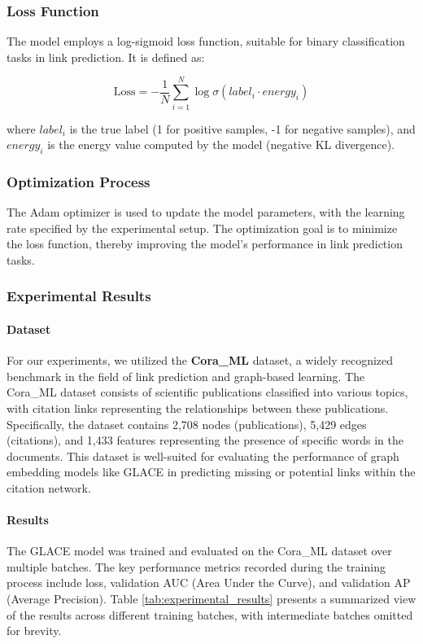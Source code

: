 \documentclass[11pt]{article}
\begin{document}
\subsubsection{Loss Function}

The model employs a log-sigmoid loss function, suitable for binary classification tasks in link prediction. It is defined as:

\[
\text{Loss} = -\frac{1}{N} \sum_{i=1}^{N} \log \sigma(label_i \cdot energy_i)
\]

where $label_i$ is the true label (1 for positive samples, -1 for negative samples), and $energy_i$ is the energy value computed by the model (negative KL divergence).

\subsubsection{Optimization Process}

The Adam optimizer is used to update the model parameters, with the learning rate specified by the experimental setup. The optimization goal is to minimize the loss function, thereby improving the model's performance in link prediction tasks.

\subsubsection{Experimental Results}

\paragraph{Dataset}
For our experiments, we utilized the \textbf{Cora\_ML} dataset, a widely recognized benchmark in the field of link prediction and graph-based learning. The Cora\_ML dataset consists of scientific publications classified into various topics, with citation links representing the relationships between these publications. Specifically, the dataset contains 2,708 nodes (publications), 5,429 edges (citations), and 1,433 features representing the presence of specific words in the documents. This dataset is well-suited for evaluating the performance of graph embedding models like GLACE in predicting missing or potential links within the citation network.

\paragraph{Results}
The GLACE model was trained and evaluated on the Cora\_ML dataset over multiple batches. The key performance metrics recorded during the training process include loss, validation AUC (Area Under the Curve), and validation AP (Average Precision). Table \ref{tab:experimental_results} presents a summarized view of the results across different training batches, with intermediate batches omitted for brevity.
\end{document}
